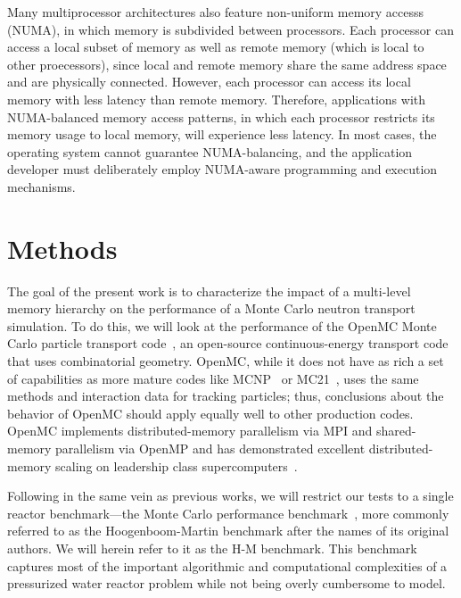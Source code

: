 \documentclass{mc2015}
\begin{document}
Many multiprocessor architectures also feature non-uniform memory accesss
(NUMA), in which memory is subdivided between processors.  Each processor can
access a local subset of memory as well as remote memory (which is local to
other proecessors), since local and remote memory share the same address space
and are physically connected.  However, each processor can access its local
memory with less latency than remote memory.  Therefore, applications with
NUMA-balanced memory access patterns, in which each processor restricts its
memory usage to local memory, will experience less latency. In most cases, the
operating system cannot guarantee NUMA-balancing, and the application developer
must deliberately employ NUMA-aware programming and execution mechanisms.

\section{Methods}

The goal of the present work is to characterize the impact of a multi-level
memory hierarchy on the performance of a Monte Carlo neutron transport
simulation. To do this, we will look at the performance of the OpenMC Monte
Carlo particle transport code~\cite{ane-romano-2013, ane-romano-2014}, an
open-source continuous-energy transport code that uses combinatorial
geometry. OpenMC, while it does not have as rich a set of capabilities as more
mature codes like MCNP~\cite{lanl-goorley-2014} or
MC21~\cite{ane-griesheimer-2014}, uses the same methods and interaction data
for tracking particles; thus, conclusions about the behavior of OpenMC should
apply equally well to other production codes. OpenMC implements
distributed-memory parallelism via MPI and shared-memory parallelism via OpenMP
and has demonstrated excellent distributed-memory scaling on leadership class
supercomputers~\cite{ane-romano-2013}.

Following in the same vein as previous works, we will restrict our tests to a
single reactor benchmark---the Monte Carlo performance
benchmark~\cite{mc-hoogenboom-2011}, more commonly referred to as the
Hoogenboom-Martin benchmark after the names of its original authors. We will
herein refer to it as the H-M benchmark. This benchmark captures most of the
important algorithmic and computational complexities of a pressurized water
reactor problem while not being overly cumbersome to model.
\end{document}
